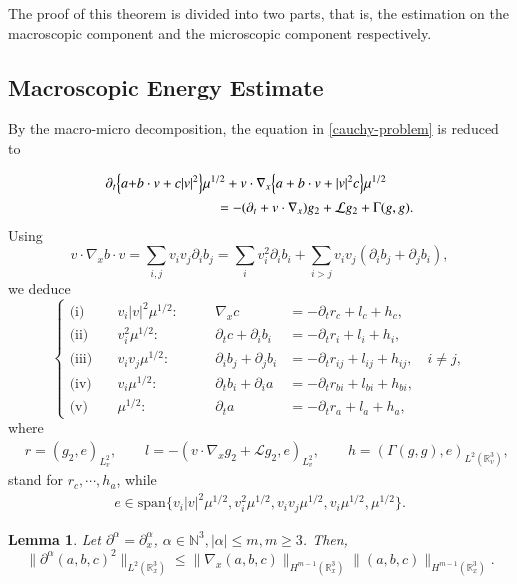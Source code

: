 \documentclass{amsart}[12pt, article]
\newtheorem{lemm}[theo]{Lemma}
\begin{document}
The proof of this theorem is divided into two parts, that is, the estimation
on the macroscopic component and the microscopic component respectively.

\subsection{Macroscopic Energy Estimate}\label{section7.1}
\setcounter{equation}{0}

By the macro-micro decomposition, the equation in
\eqref{cauchy-problem} is reduced to

\begin{align*}
\partial_t\Big\{ a + &b\cdot v+ c| v|^2 \Big\} \mu^{1/2}
+v\cdot\nabla_x\Big\{ a + b\cdot v+|v|^2 c\Big\} \mu^{1/2}
\\&\hspace*{2cm}=
-({{\partial}}_t+v\cdot \nabla_x)g_2+\mathcal{L} g_2+\Gamma(g,g).\notag
\end{align*}
Using
$$v\cdot\nabla_x b\cdot v=\sum_{i,j}v_iv_j\partial_i b_j
=\sum_{i}v_i^2 \partial_i b_i+\sum_{i>j}v_iv_j(\partial_i b_j+\partial_jb_i),
$$
we deduce
\begin{equation}\label{macroeq}
\left\{
\begin{array}{lrlrl}
\text{(i)}\quad& v_i | v|^2 \mu^{1/2} :&\quad&\nabla_x c &= -\partial_t r_c+l_c + h_c,
\\
\text{(ii)}\quad &v^2_i \mu^{1/2}:&\quad&\partial_t c +\partial_ib_i &= -\partial_t r_i+l_i + h_i ,
\\
\text{(iii)}\quad& v_iv_j \mu^{1/2}:& &\partial_ib_j + \partial_j b_i &
= -\partial_t r_{ij}+l_{ij} + h_{ij} , \quad i\neq j,
\\
\text{(iv)}\quad& v_i \mu^{1/2} :&&\partial_t b_i + \partial_i a &
= -\partial_t r_{bi}+l_{bi} + h_{bi},
\\
\text{(v)}\quad& \mu^{1/2} :&& \partial_t a &= -\partial_t r_a+l_a + h_a,
\end{array}
\right.
\end{equation}
where
\begin{align*}
&r=(g_2,e)_{L^2_v},\qquad l=-(v\cdot\nabla_x g_2+\mathcal{L} g_2,e)_{L^2_v},
\qquad h=(\Gamma(g,g),e)_{L^2({{{\mathbb R}}}^3_v)},
\end{align*}
stand for $r_c, \cdots, h_a$, while
\begin{align*}
 e\in \text{span}
\lbrace v_i | v|^2 \mu^{1/2} , v^2_i \mu^{1/2} ,
v_iv_j \mu^{1/2}, v_i \mu^{1/2} , \mu^{1/2} \rbrace.
\end{align*}
\begin{lemm}\label{abc2}
Let ${{\partial}}^\alpha={{\partial}}^\alpha_x$, $\alpha\in{{\mathbb N}}^3, |\alpha|\le m, m\ge 3$. Then,
\begin{equation*}
\|{{\partial}}^\alpha (a,b,c)^2\|_{L^2({{{\mathbb R}}}^3_x)}\le \|\nabla_x (a,b,c)
\|_{H^{m-1}({{{\mathbb R}}}^3_{x})}\|(a,b,c)\|_{H^{m-1}({{{\mathbb R}}}^3_{x})}.
\end{equation*}
\end{lemm}
\end{document}
